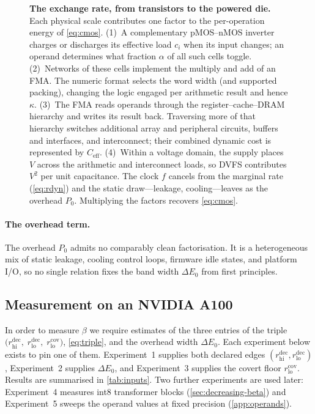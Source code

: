 \documentclass{article}
\theoremstyle{plain}
\theoremstyle{definition}
\theoremstyle{remark}
\providecommand{\DIFaddendFL}{} %
\DeclareRobustCommand{\DIFaddendFL}{\DIFOaddendFL \let\includegraphics\DIFOincludegraphics} %
\begin{document}
\begin{figure}[t]
{\begin{tikzpicture}
	\end{tikzpicture}%
	}
	\DIFaddendFL \caption{\textbf{The exchange rate, from transistors to the powered die.}
		Each physical scale contributes one factor to the per-operation energy of
		\cref{eq:cmos}. (1)~A complementary pMOS--nMOS inverter charges or discharges
		its effective load \(c_i\) when its input changes; an operand determines
		what fraction \(\alpha\) of all such cells toggle. (2)~Networks of these
		cells implement the multiply and add of an FMA. The numeric format selects
		the word width (and supported packing), changing the logic engaged per
		arithmetic result and hence \(\kappa\). (3)~The FMA reads operands through
		the register--cache--DRAM hierarchy and writes its result back. Traversing
		more of that hierarchy switches additional array and peripheral circuits,
		buffers and interfaces, and interconnect; their combined dynamic cost is
		represented by \(C_{\mathrm{eff}}\). (4)~Within a voltage domain, the supply places
		\(V\) across the arithmetic and interconnect loads, so DVFS contributes
		\(V^2\) per unit capacitance. The
		clock \(f\) cancels from the marginal rate (\cref{eq:rdyn}) and the static
		draw---leakage, cooling---leaves as the overhead \(P_0\).
		Multiplying the factors recovers \cref{eq:cmos}.}
	\label{fig:exchange-scales}
\end{figure}

\paragraph{The overhead term.}
The overhead $P_0$ admits no comparably
clean factorisation. It is a
heterogeneous mix of static leakage, cooling control loops, firmware idle states,
and platform I/O, so no single relation fixes the band width $\Delta E_0$ from
first principles.

\subsection{Measurement on an NVIDIA A100}
\label{sec:empirical-measurements}
In order to measure $\beta$ we require estimates of the three entries of the triple $	\bigl(r_{\mathrm{hi}}^{\mathrm{dec}},\;r_{\mathrm{lo}}^{\mathrm{dec}},\;
	r_{\mathrm{lo}}^{\mathrm{cov}}\bigr)$, 
\cref{eq:triple}, and the overhead width $\Delta E_0$. Each experiment below
exists to pin one of them. Experiment~1 supplies both declared edges
$(r_{\mathrm{hi}}^{\mathrm{dec}}, r_{\mathrm{lo}}^{\mathrm{dec}})$,
Experiment~2 supplies $\Delta E_0$, and Experiment~3 supplies the covert floor
$r_{\mathrm{lo}}^{\mathrm{cov}}$. Results are summarised in \cref{tab:inputs}. Two further
experiments are used later: Experiment~4 measures int8 transformer blocks
(\cref{sec:decreasing-beta}) and Experiment~5 sweeps the operand values at
fixed precision (\cref{app:operands}).
\end{document}

